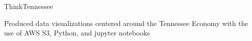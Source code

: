 
\begin{cventries}
  \cventry
    {} %
    {ThinkTennessee} %
    {} %
    {} %
    {
      \begin{cvitems} %
        \item {Produced data visualizations centered around the Tennessee
            Economy with the use of AWS S3, Python, and jupyter notebooks}
      \end{cvitems}
    }
\end{cventries}
